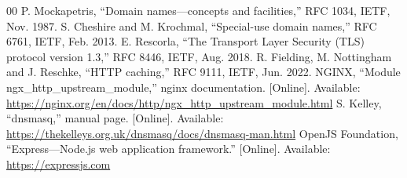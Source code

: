 \documentclass[conference]{IEEEtran}
\begin{document}
\begin{thebibliography}{00}
 P. Mockapetris, ``Domain names---concepts and facilities,'' RFC 1034, IETF, Nov. 1987.
 S. Cheshire and M. Krochmal, ``Special-use domain names,'' RFC 6761, IETF, Feb. 2013.
 E. Rescorla, ``The Transport Layer Security (TLS) protocol version 1.3,'' RFC 8446, IETF, Aug. 2018.
 R. Fielding, M. Nottingham and J. Reschke, ``HTTP caching,'' RFC 9111, IETF, Jun. 2022.
 NGINX, ``Module ngx\_http\_upstream\_module,'' nginx documentation. [Online]. Available: \url{https://nginx.org/en/docs/http/ngx_http_upstream_module.html}
 S. Kelley, ``dnsmasq,'' manual page. [Online]. Available: \url{https://thekelleys.org.uk/dnsmasq/docs/dnsmasq-man.html}
 OpenJS Foundation, ``Express---Node.js web application framework.'' [Online]. Available: \url{https://expressjs.com}
\end{thebibliography}
\end{document}

